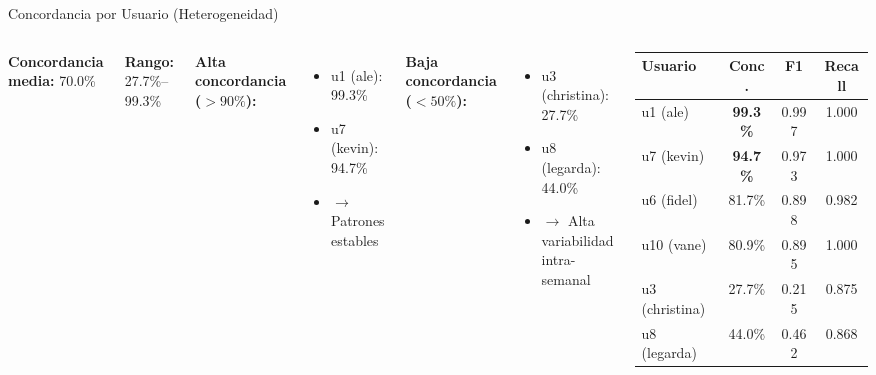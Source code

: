 \documentclass[aspectratio=169]{beamer}
\begin{document}
\begin{frame}{Concordancia por Usuario (Heterogeneidad)}

\begin{columns}[T]
\textbf{Concordancia media:} 70.0\%

\textbf{Rango:} 27.7\%--99.3\%

\vspace{0.5cm}

\textbf{Alta concordancia ($>90\%$):}
\begin{itemize}
    \item u1 (ale): 99.3\%
    \item u7 (kevin): 94.7\%
    \item $\rightarrow$ Patrones estables
\end{itemize}

\vspace{0.3cm}

\textbf{Baja concordancia ($<50\%$):}
\begin{itemize}
    \item u3 (christina): 27.7\%
    \item u8 (legarda): 44.0\%
    \item $\rightarrow$ Alta variabilidad intra-semanal
\end{itemize}

\begin{table}
\centering
\small
\begin{tabular}{lccc}
\toprule
\textbf{Usuario} & \textbf{Conc.} & \textbf{F1} & \textbf{Recall} \\
\midrule
u1 (ale) & \textbf{99.3\%} & 0.997 & 1.000 \\
u7 (kevin) & \textbf{94.7\%} & 0.973 & 1.000 \\
u6 (fidel) & 81.7\% & 0.898 & 0.982 \\
u10 (vane) & 80.9\% & 0.895 & 1.000 \\
u3 (christina) & 27.7\% & 0.215 & 0.875 \\
u8 (legarda) & 44.0\% & 0.462 & 0.868 \\
\bottomrule
\end{tabular}
\end{table}
\end{columns}

\end{frame}

\end{document}
